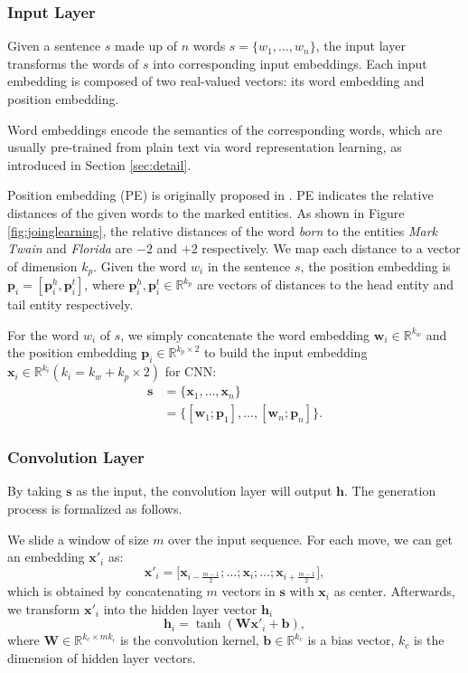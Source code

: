 \documentclass[11pt,a4paper]{article}
\begin{document}
\subsubsection{Input Layer}
Given a sentence $s$ made up of $n$ words $s = \{ w_1, \ldots , w_n\}$, the input layer transforms the words of $s$ into corresponding input embeddings. Each input embedding is composed of two real-valued vectors: its word embedding and position embedding.

Word embeddings encode the semantics of the corresponding words, which are usually pre-trained from plain text via word representation learning, as introduced in Section \ref{sec:detail}.

Position embedding (PE) is originally proposed in \cite{zeng2014relation}. PE indicates the relative distances of the given words to the marked entities. As shown in Figure \ref{fig:joinglearning}, the relative distances of the word \emph{born} to the entities \emph{Mark Twain} and \emph{Florida} are $-2$ and $+2$ respectively. We map each distance to a vector of dimension $k_p$. Given the word $w_i$ in the sentence $s$, the position embedding is $\mathbf{p}_i = [\mathbf{p}^h_i, \mathbf{p}^t_i]$, where $\mathbf{p}^h_i, \mathbf{p}^t_i \in \mathbb{R}^{k_p}$ are vectors of distances to the head entity and tail entity respectively.

For the word $w_i$ of $s$, we simply concatenate the word embedding $\mathbf{w}_i \in \mathbb{R}^{k_w} $ and the position embedding $\mathbf{p}_i \in \mathbb{R}^{k_p \times 2} $ to build the input embedding $\mathbf{x}_i \in \mathbb{R}^{k_i} (k_i = k_w + k_p \times 2)$ for CNN:
\begin{align}
\mathbf{s} & = \{\mathbf{x}_1,\ldots, \mathbf{x}_n\} \\\nonumber
&=\{[\mathbf{w}_1;\mathbf{p}_1],\ldots, [\mathbf{w}_n;\mathbf{p}_n]\}.
\end{align}


\subsubsection{Convolution Layer}
By taking $\mathbf{s}$ as the input, the convolution layer will output $\mathbf{h}$. The generation process is formalized as follows.

We slide a window of size $m$ over the input sequence. For each move, we can get an embedding $\mathbf{x}'_i$ as:
\begin{equation}
\mathbf{x}'_i = \big[ \mathbf{x}_{i - \frac{m-1}{2}}; \ldots ; \mathbf{x}_i; \ldots ;\mathbf{x}_{i + \frac{m-1}{2}} \big],
\end{equation}
which is obtained by concatenating $m$ vectors in $\mathbf{s}$ with $\mathbf{x}_i$ as center. Afterwards, we transform $\mathbf{x}'_i$ into the hidden layer vector $\mathbf{h}_i$
\begin{equation}
\mathbf{h}_i = \tanh(\mathbf{W}\mathbf{x}'_i + \mathbf{b}),
\end{equation}
where $\mathbf{W} \in \mathbb{R}^{k_c \times mk_i}$ is the convolution kernel, $\mathbf{b} \in \mathbb{R}^{k_c}$ is a bias vector, $k_c$ is the dimension of hidden layer vectors.
\end{document}
